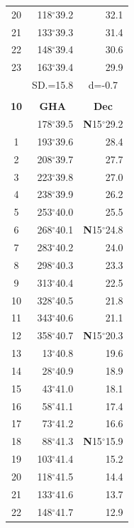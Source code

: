 \documentclass[10pt, a4paper]{report}
\begin{document}
\begin{scriptsize}
\begin{tabular*}{0.2\textwidth}[t]{@{\extracolsep{\fill}}|c|rr|}
20 & 118$^\circ$39.2 & 32.1\\
21 & 133$^\circ$39.3 & \raisebox{0.24ex}{\boldmath$\cdot$~\boldmath$\cdot$~~}31.4\\
22 & 148$^\circ$39.4 & 30.6\\
23 & 163$^\circ$39.4 & 29.9\\
\hline
\rule{0pt}{2.4ex} & \multicolumn{1}{c}{SD.=15.8} & \multicolumn{1}{c|}{d=-0.7}\\
\hline
\multicolumn{1}{c}{}\\[-0.5ex]\hline
\multicolumn{1}{|c|}{\rule{0pt}{2.6ex}\textbf{10}} & \multicolumn{1}{c}{\textbf{GHA}} & \multicolumn{1}{c|}{\textbf{Dec}}\\
\hline\rule{0pt}{2.6ex}\noindent
0 & 178$^\circ$39.5 & \textbf{N}15$^\circ$29.2\\
1 & 193$^\circ$39.6 & 28.4\\
2 & 208$^\circ$39.7 & 27.7\\
3 & 223$^\circ$39.8 & \raisebox{0.24ex}{\boldmath$\cdot$~\boldmath$\cdot$~~}27.0\\
4 & 238$^\circ$39.9 & 26.2\\
5 & 253$^\circ$40.0 & 25.5\\[2Pt]
6 & 268$^\circ$40.1 & \textbf{N}15$^\circ$24.8\\
7 & 283$^\circ$40.2 & 24.0\\
8 & 298$^\circ$40.3 & 23.3\\
9 & 313$^\circ$40.4 & \raisebox{0.24ex}{\boldmath$\cdot$~\boldmath$\cdot$~~}22.5\\
10 & 328$^\circ$40.5 & 21.8\\
11 & 343$^\circ$40.6 & 21.1\\[2Pt]
12 & 358$^\circ$40.7 & \textbf{N}15$^\circ$20.3\\
13 & 13$^\circ$40.8 & 19.6\\
14 & 28$^\circ$40.9 & 18.9\\
15 & 43$^\circ$41.0 & \raisebox{0.24ex}{\boldmath$\cdot$~\boldmath$\cdot$~~}18.1\\
16 & 58$^\circ$41.1 & 17.4\\
17 & 73$^\circ$41.2 & 16.6\\[2Pt]
18 & 88$^\circ$41.3 & \textbf{N}15$^\circ$15.9\\
19 & 103$^\circ$41.4 & 15.2\\
20 & 118$^\circ$41.5 & 14.4\\
21 & 133$^\circ$41.6 & \raisebox{0.24ex}{\boldmath$\cdot$~\boldmath$\cdot$~~}13.7\\
22 & 148$^\circ$41.7 & 12.9\\

\end{tabular*}
\end{scriptsize}
\end{document}
